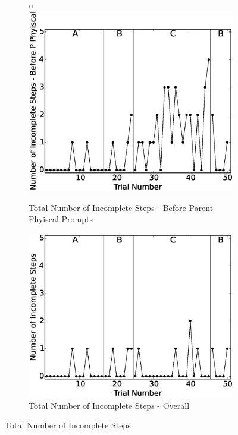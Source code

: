 \begin{figure}[h]
	
	\begin{subfigure}[b]{0.49\textwidth}
u		\includegraphics[width=1.1\linewidth]{./img/data_analysis/5NumberofIncompleteSteps-BeforePPhyiscal.eps}
		\caption{Total Number of Incomplete Steps - Before Parent Phyiscal Prompts}
		\label{fig:5TotalNumberofIncompleteSteps-BeforePhyiscalPrompts}
	\end{subfigure}%
	\hfill
	\begin{subfigure}[b]{0.49\textwidth}
		\includegraphics[width=1.1\linewidth]{./img/data_analysis/4NumberofIncompleteSteps.eps}
		\caption{Total Number of Incomplete Steps - Overall}
		\label{fig:4TotalNumberofIncompleteSteps}
	\end{subfigure}%
	\caption{Total Number of Incomplete Steps}
	\label{fig:TotalNumberOfIncompleteSteps}
\end{figure}

